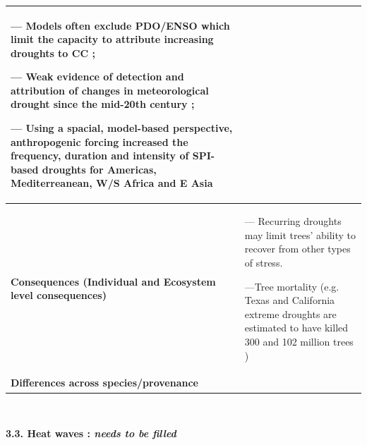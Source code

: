 \documentclass{article}
\begin{document}
\begin{enumerate}
{\begin{tabular}{|>{\raggedright\arraybackslash}p{4cm}|p{12cm}|}
— Models often exclude PDO/ENSO which limit the capacity to attribute increasing droughts to CC  \cite{trenberth_global_2014}; 

— Weak evidence of detection and attribution of changes in meteorological drought since the mid-20th century \cite{intergovernmental_panel_on_climate_change_detection_2014}; 

— Using a spacial, model-based perspective, anthropogenic forcing increased the frequency, duration and intensity of SPI-based droughts for Americas, Mediterreanean, W/S Africa and E Asia \cite{chiang_evidence_2021} \\
\hline
\textbf{Consequences (Individual and Ecosystem level consequences)} & — Recurring droughts may limit trees' ability to recover from other types of stress.

—Tree mortality (e.g. Texas and California extreme droughts are estimated to have killed 300 and 102 million trees \cite{li_widespread_2023})\\ %
\hline
\textbf{Differences across species/provenance} &  \\
\hline
\end{tabular}
} \\
\par

\textbf{3.3. Heat waves : \textit{needs to be filled}}\\





\end{enumerate}
\end{document}
